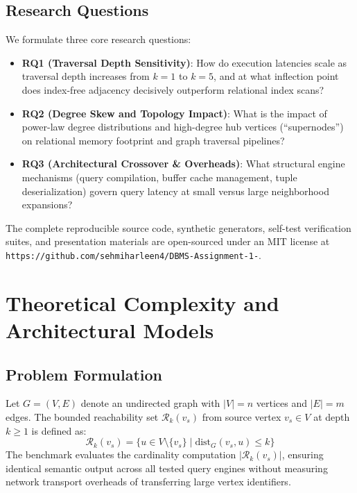 \documentclass[conference,10pt]{IEEEtran}%
\newcommand{\ghurl}{\texttt{https://github.com/sehmiharleen4/DBMS-Assignment-1-}}
\begin{document}
\subsection{Research Questions}
We formulate three core research questions:
\begin{itemize}
    \item \textbf{RQ1 (Traversal Depth Sensitivity)}: How do execution latencies scale as traversal depth increases from $k=1$ to $k=5$, and at what inflection point does index-free adjacency decisively outperform relational index scans?
    \item \textbf{RQ2 (Degree Skew and Topology Impact)}: What is the impact of power-law degree distributions and high-degree hub vertices (``supernodes'') on relational memory footprint and graph traversal pipelines?
    \item \textbf{RQ3 (Architectural Crossover & Overheads)}: What structural engine mechanisms (query compilation, buffer cache management, tuple deserialization) govern query latency at small versus large neighborhood expansions?
\end{itemize}

The complete reproducible source code, synthetic generators, self-test verification suites, and presentation materials are open-sourced under an MIT license at \ghurl.

\section{Theoretical Complexity and Architectural Models}

\subsection{Problem Formulation}
Let $G = (V, E)$ denote an undirected graph with $|V| = n$ vertices and $|E| = m$ edges. The bounded reachability set $\mathcal{R}_k(v_s)$ from source vertex $v_s \in V$ at depth $k \ge 1$ is defined as:
\begin{equation}
\mathcal{R}_k(v_s) = \{ u \in V \setminus \{v_s\} \mid \text{dist}_G(v_s, u) \le k \}
\end{equation}
The benchmark evaluates the cardinality computation $|\mathcal{R}_k(v_s)|$, ensuring identical semantic output across all tested query engines without measuring network transport overheads of transferring large vertex identifiers.
\end{document}

